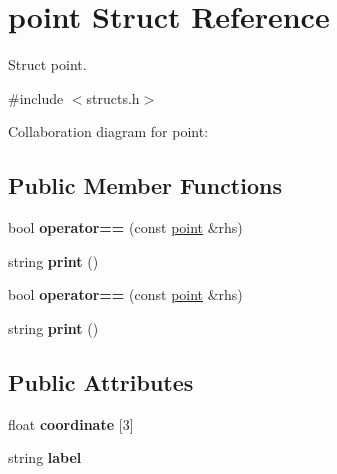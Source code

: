 \hypertarget{structpoint}{}\section{point Struct Reference}
\label{structpoint}


Struct point.  




{\ttfamily \#include $<$structs.\+h$>$}



Collaboration diagram for point\+:
\subsection*{Public Member Functions}
\begin{DoxyCompactItemize}
\item 
bool {\bfseries operator==} (const \hyperlink{structpoint}{point} \&rhs)\hypertarget{structpoint_ab7d525ec6723f8960ae67505562cc49a}{}\label{structpoint_ab7d525ec6723f8960ae67505562cc49a}

\item 
string {\bfseries print} ()\hypertarget{structpoint_af90e6b5c7b1e845241e8e9a2cdf1b666}{}\label{structpoint_af90e6b5c7b1e845241e8e9a2cdf1b666}

\item 
bool {\bfseries operator==} (const \hyperlink{structpoint}{point} \&rhs)\hypertarget{structpoint_ab7d525ec6723f8960ae67505562cc49a}{}\label{structpoint_ab7d525ec6723f8960ae67505562cc49a}

\item 
string {\bfseries print} ()\hypertarget{structpoint_af90e6b5c7b1e845241e8e9a2cdf1b666}{}\label{structpoint_af90e6b5c7b1e845241e8e9a2cdf1b666}

\end{DoxyCompactItemize}
\subsection*{Public Attributes}
\begin{DoxyCompactItemize}
\item 
float {\bfseries coordinate} \mbox{[}3\mbox{]}\hypertarget{structpoint_a460acc9b7224d448646838f2c92a42b4}{}\label{structpoint_a460acc9b7224d448646838f2c92a42b4}

\item 
string {\bfseries label}\hypertarget{structpoint_aac98b52176e98d5ae6ab04ff1351fb14}{}\label{structpoint_aac98b52176e98d5ae6ab04ff1351fb14}

\end{DoxyCompactItemize}


